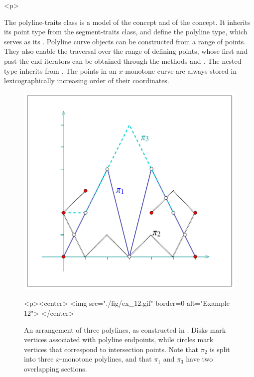 \begin{ccHtmlOnly}<p>\end{ccHtmlOnly}
The polyline-traits class is a model of the
 concept and of the
 concept. It inherits its point
type from the segment-traits class, and define the polyline type,
which serves as its . Polyline curve objects can be
constructed from a range of points. They also enable the traversal
over the range of defining points, whose first and past-the-end
iterators can be obtained through the methods  and
. The nested  type inherits
from . The points in an $x$-monotone curve are
always stored in lexicographically increasing order of their
coordinates.

\begin{figure}[!htp]
\begin{ccTexOnly}
  \begin{center}
  \includegraphics{Arrangement_2/fig/ex_12}
  \end{center}
\end{ccTexOnly}
\begin{ccHtmlOnly}
  <p><center>
  <img src="./fig/ex_12.gif" border=0 alt="Example 12">
  </center>
\end{ccHtmlOnly}
\caption{An arrangement of three polylines, as constructed in
. Disks mark vertices associated with
polyline endpoints, while circles mark vertices that correspond
to intersection points. Note that $\pi_2$ is split into three
$x$-monotone polylines, and that $\pi_1$ and $\pi_3$ have two
overlapping sections.}
\label{arr_fig:ex_12}
\end{figure}

